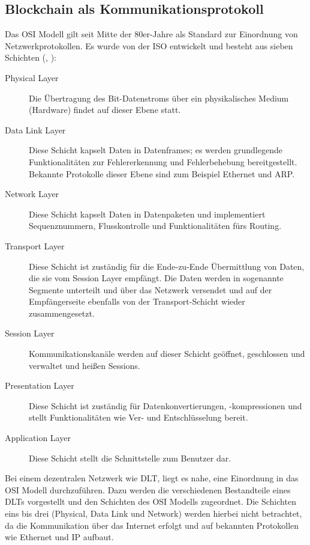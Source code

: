 \subsection{Blockchain als Kommunikationsprotokoll}
\label{subsec:fundamentals:dlt:protocol}
Das \ac{OSI} Modell gilt seit Mitte der 80er-Jahre als Standard zur Einordnung von Netzwerkprotokollen. Es wurde von der \ac{ISO} entwickelt und besteht aus sieben Schichten (\cite{OSI1980}, \cite{osi2014}):
\begin{description}
  \item[Physical Layer] Die Übertragung des Bit-Datenstroms über ein physikalisches Medium (Hardware) findet auf dieser Ebene statt.
  \item[Data Link Layer] Diese Schicht kapselt Daten in Datenframes; es werden grundlegende Funktionalitäten zur Fehlererkennung und Fehlerbehebung bereitgestellt. Bekannte Protokolle dieser Ebene sind zum Beispiel Ethernet und \ac{ARP}.
  \item[Network Layer] Diese Schicht kapselt Daten in Datenpaketen und implementiert Sequenznummern, Flusskontrolle und Funktionalitäten fürs Routing.
  \item[Transport Layer] Diese Schicht ist zuständig für die Ende-zu-Ende Übermittlung von Daten, die sie vom Session Layer empfängt. Die Daten werden in sogenannte Segmente unterteilt und über das Netzwerk versendet und auf der Empfängerseite ebenfalls von der Transport-Schicht wieder zusammengesetzt.
  \item[Session Layer] Kommunikationskanäle werden auf dieser Schicht geöffnet, geschlossen und verwaltet und heißen Sessions.
  \item[Presentation Layer] Diese Schicht ist zuständig für Datenkonvertierungen, -kompressionen und stellt Funktionalitäten wie Ver- und Entschlüsselung bereit.
  \item[Application Layer] Diese Schicht stellt die Schnittstelle zum Benutzer dar.
\end{description}

Bei einem dezentralen Netzwerk wie \ac{DLT}, liegt es nahe, eine Einordnung in das \ac{OSI} Modell durchzuführen. Dazu werden die verschiedenen Bestandteile eines \ac{DLT}s vorgestellt und den Schichten des \ac{OSI} Modells zugeordnet. Die Schichten eins bis drei (Physical, Data Link und Network) werden hierbei nicht betrachtet, da die Kommunikation über das Internet erfolgt und auf bekannten Protokollen wie Ethernet und IP aufbaut.

